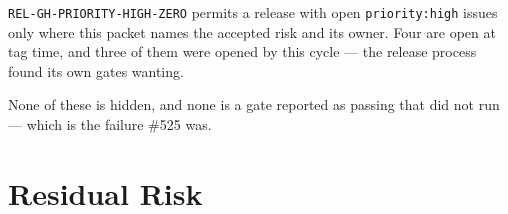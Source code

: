 \texttt{R\allowbreak{}E\allowbreak{}L\allowbreak{}-\allowbreak{}G\allowbreak{}H\allowbreak{}-\allowbreak{}P\allowbreak{}R\allowbreak{}I\allowbreak{}O\allowbreak{}R\allowbreak{}I\allowbreak{}T\allowbreak{}Y\allowbreak{}-\allowbreak{}H\allowbreak{}I\allowbreak{}G\allowbreak{}H\allowbreak{}-\allowbreak{}Z\allowbreak{}E\allowbreak{}R\allowbreak{}O} permits a release with open \texttt{p\allowbreak{}r\allowbreak{}i\allowbreak{}o\allowbreak{}r\allowbreak{}i\allowbreak{}t\allowbreak{}y\allowbreak{}:\allowbreak{}h\allowbreak{}i\allowbreak{}g\allowbreak{}h} issues only where this packet names the accepted risk and its owner. Four are open at tag time, and three of them were opened by this cycle --- the release process found its own gates wanting.



None of these is hidden, and none is a gate reported as passing that did not run --- which is the failure \#525 was.

\section{Residual Risk}\label{record-262-residual-risk}

